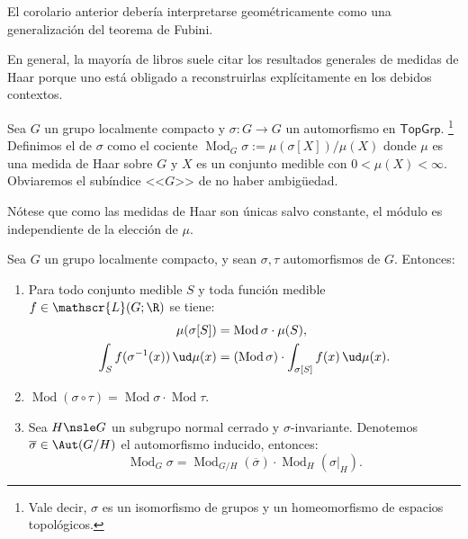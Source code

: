 \documentclass[teoria-numeros.tex]{subfiles}
\begin{document}
El corolario anterior debería interpretarse geométricamente como una generalización del teorema de Fubini.

En general, la mayoría de libros suele citar los resultados generales de medidas de Haar porque uno está obligado a reconstruirlas explícitamente
en los debidos contextos.

\newcommand{\Mod}{\operatorname{Mod}}
\begin{mydef}
	Sea $G$ un grupo localmente compacto y $\sigma \colon G \to G$ un automorfismo en $\mathsf{TopGrp}$.%
	\footnote{Vale decir, $\sigma$ es un isomorfismo de grupos y un homeomorfismo de espacios topológicos.}
	Definimos el  de $\sigma$ como el cociente $\Mod_G\sigma := \mu( \sigma[X] )/\mu(X)$
	donde $\mu$ es una medida de Haar sobre $G$ y $X$ es un conjunto medible con $0 < \mu(X) < \infty$.
	Obviaremos el subíndice <<$G$>> de no haber ambigüedad.
\end{mydef}
Nótese que como las medidas de Haar son únicas salvo constante, el módulo es independiente de la elección de $\mu$.

\begin{prop}
	Sea $G$ un grupo localmente compacto, y sean $\sigma, \tau$ automorfismos de $G$.
	Entonces:
	\begin{enumerate}
		\item Para todo conjunto medible $S$ y toda función medible $f \in \mathscr{L}(G; \R)$ se tiene:
			\begin{align*}
				\mu( \sigma[S] ) &= \Mod\sigma \cdot \mu(S), \\
				\int_{S} f(\sigma^{-1}(x)) \, \ud\mu(x) &= (\Mod\sigma) \cdot \int_{\sigma[S]} f(x) \, \ud\mu(x).
			\end{align*}
		\item $\Mod(\sigma\circ\tau) = \Mod\sigma \cdot \Mod\tau$.
		\item Sea $H \nsle G$ un subgrupo normal cerrado y $\sigma$-invariante.
			Denotemos $\overline{\sigma} \in \Aut(G/H)$ el automorfismo inducido, entonces:
			$$ \Mod_G\sigma = \Mod_{G/H}(\overline{\sigma}) \cdot \Mod_H(\sigma|_H). $$
	\end{enumerate}
\end{prop}
\end{document}
